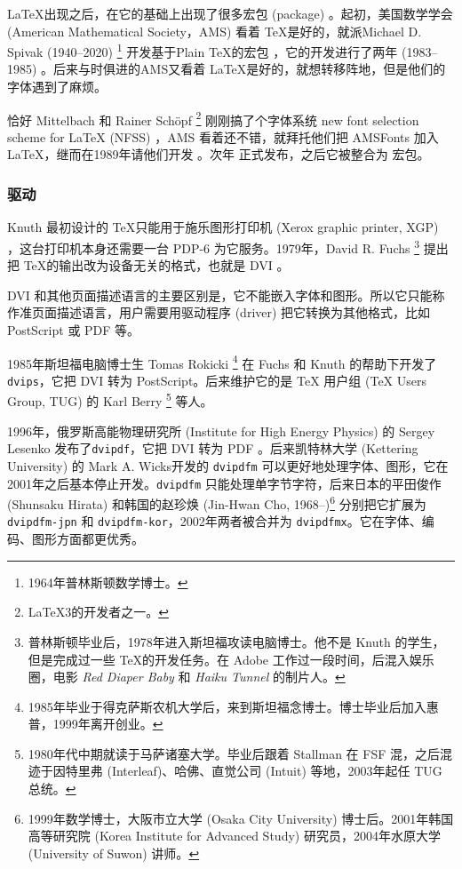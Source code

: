 \LaTeX 出现之后，在它的基础上出现了很多宏包 (package) 。起初，美国数学学会 (American Mathematical Society，AMS)\indexAMS{} 看着 \TeX 是好的，就派Michael D. Spivak (1940--2020)\indexSpivak{} \footnote{1964年普林斯顿数学博士。} 开发基于Plain \TeX 的宏包 \AmSTeX，它的开发进行了两年 (1983--1985) 。后来与时俱进的AMS又看着 \LaTeX 是好的，就想转移阵地，但是他们的字体遇到了麻烦。

恰好 Mittelbach 和 Rainer Schöpf\indexSchopf{} \footnote{\LaTeX 3的开发者之一。} 刚刚搞了个字体系统 new font selection scheme for \LaTeX{} (NFSS) ，AMS 看着还不错，就拜托他们把 AMSFonts 加入 \LaTeX，继而在1989年请他们开发 \AmSLaTeX。次年 \AmSLaTeX 正式发布，之后它被整合为 \AmS 宏包。

\subsubsection{驱动}

Knuth\indexKnuth{} 最初设计的 \TeX 只能用于施乐图形打印机 (Xerox graphic printer, XGP) ，这台打印机本身还需要一台 PDP-6 为它服务。1979年，David R. Fuchs\indexFuchs{} \footnote{普林斯顿毕业后，1978年进入斯坦福攻读电脑博士。他不是 Knuth 的学生，但是完成过一些 \TeX 的开发任务。在 Adobe 工作过一段时间，后混入娱乐圈，电影 \emph{Red Diaper Baby} 和 \emph{Haiku Tunnel} 的制片人。} 提出把 \TeX 的输出改为设备无关的格式，也就是 DVI 。

DVI 和其他页面描述语言的主要区别是，它不能嵌入字体和图形。所以它只能称作准页面描述语言，用户需要用驱动程序 (driver) 把它转换为其他格式，比如 PostScript 或 PDF 等。

1985年斯坦福电脑博士生 Tomas Rokicki\indexRokicki{} \footnote{1985年毕业于得克萨斯农机大学后，来到斯坦福念博士。博士毕业后加入惠普，1999年离开创业。} 在 Fuchs 和 Knuth 的帮助下开发了\texttt{dvips}，它把 DVI 转为 PostScript。后来维护它的是 TeX 用户组 (TeX Users Group, TUG)\indexTUG{} 的 Karl Berry\indexBerry{} \footnote{1980年代中期就读于马萨诸塞大学。毕业后跟着 Stallman 在 FSF 混，之后混迹于因特里弗 (Interleaf)、哈佛、直觉公司 (Intuit) 等地，2003年起任 TUG 总统。} 等人。

1996年，俄罗斯高能物理研究所 (Institute for High Energy Physics) 的 Sergey Lesenko\indexLesenko{} 发布了\texttt{dvipdf}，它把 DVI 转为 PDF 。后来凯特林大学 (Kettering University) 的 Mark A. Wicks\indexWicks 开发的 \texttt{dvipdfm} 可以更好地处理字体、图形，它在2001年之后基本停止开发。\texttt{dvipdfm} 只能处理单字节字符，后来日本的平田俊作 (Shunsaku Hirata)\indexHirata{} 和韩国的赵珍焕 (Jin-Hwan Cho, 1968--)\indexCho{}\footnote{1999年数学博士，大阪市立大学 (Osaka City University) 博士后。2001年韩国高等研究院 (Korea Institute for Advanced Study) 研究员，2004年水原大学 (University of Suwon) 讲师。} 分别把它扩展为 \texttt{dvipdfm-jpn} 和 \texttt{dvipdfm-kor}，2002年两者被合并为 \texttt{dvipdfmx}。它在字体、编码、图形方面都更优秀。


